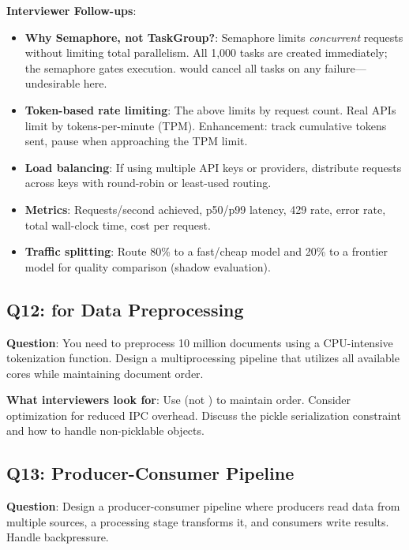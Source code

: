 \textbf{Interviewer Follow-ups}:
\begin{itemize}[leftmargin=*]
    \item \textbf{Why Semaphore, not TaskGroup?}: Semaphore limits \emph{concurrent} requests without limiting total parallelism. All 1,000 tasks are created immediately; the semaphore gates execution.  would cancel all tasks on any failure---undesirable here.
    \item \textbf{Token-based rate limiting}: The above limits by request count. Real APIs limit by tokens-per-minute (TPM). Enhancement: track cumulative tokens sent, pause when approaching the TPM limit.
    \item \textbf{Load balancing}: If using multiple API keys or providers, distribute requests across keys with round-robin or least-used routing.
    \item \textbf{Metrics}: Requests/second achieved, p50/p99 latency, 429 rate, error rate, total wall-clock time, cost per request.
    \item \textbf{Traffic splitting}: Route 80\% to a fast/cheap model and 20\% to a frontier model for quality comparison (shadow evaluation).
\end{itemize}

\subsection{Q12:  for Data Preprocessing}

\textbf{Question}: You need to preprocess 10 million documents using a CPU-intensive tokenization function. Design a multiprocessing pipeline that utilizes all available cores while maintaining document order.

\textbf{What interviewers look for}: Use  (not ) to maintain order. Consider  optimization for reduced IPC overhead. Discuss the pickle serialization constraint and how to handle non-picklable objects.

\subsection{Q13: Producer-Consumer Pipeline}

\textbf{Question}: Design a producer-consumer pipeline where producers read data from multiple sources, a processing stage transforms it, and consumers write results. Handle backpressure.

